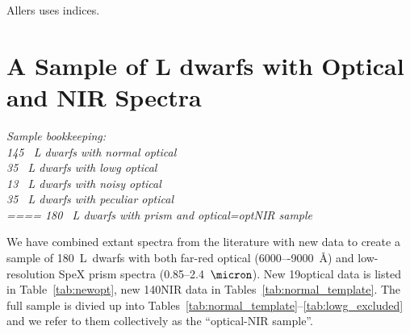 \documentclass[12pt,preprint]{aastex}
\newcommand{\sample}{180}
\newcommand{\optNormal}{145}
\newcommand{\optLowG}{35}
\newcommand{\optNoisy}{13}
\newcommand{\optPec}{35}
\newcommand{\newopt}{19} %
\newcommand{\prismspectra}{140} %
\begin{document}
Allers uses indices.

% 

\section{A Sample of L dwarfs with Optical and NIR Spectra}
\label{sec:sample}

\emph{Sample bookkeeping:\\
\optNormal~ L dwarfs with normal optical\\
\optLowG~ L dwarfs with lowg optical\\
\optNoisy~ L dwarfs with  noisy optical\\
\optPec~ L dwarfs with  peculiar optical\\
====
\sample~ L dwarfs with prism and optical=optNIR sample\\
}

We have combined extant spectra from the literature with new data to create a sample of \sample~L~dwarfs with both far-red optical (6000–-9000~\AA) and low-resolution SpeX prism spectra (0.85--2.4~$\micron$). New \newopt optical data is listed in Table~\ref{tab:newopt}, new \prismspectra NIR data in Tables~\ref{tab:normal_template}. 
The full sample is divied up into Tables~\ref{tab:normal_template}--\ref{tab:lowg_excluded} and we refer to them collectively as the ``optical-NIR sample''. 
\end{document}
